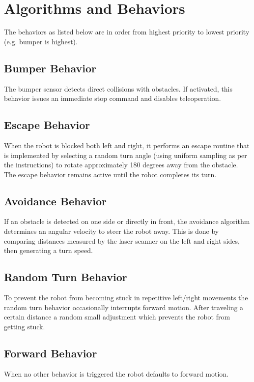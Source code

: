 \documentclass[12pt]{article}
\begin{document}
\section{Algorithms and Behaviors}

The behaviors as listed below are in order from highest priority to lowest priority (e.g. bumper is highest).

\subsection{Bumper Behavior}
The bumper sensor detects direct collisions with obstacles. If activated, this behavior issues an immediate stop command and disables teleoperation.

\subsection{Escape Behavior}
When the robot is blocked both left and right, it performs an escape routine that is implemented by selecting a random turn angle (using uniform sampling as per the instructions) to rotate approximately 180 degrees away from the obstacle. The escape behavior remains active until the robot completes its turn.

\subsection{Avoidance Behavior}
If an obstacle is detected on one side or directly in front, the avoidance algorithm determines an angular velocity to steer the robot away. This is done by comparing distances measured by the laser scanner on the left and right sides, then generating a turn speed.

\subsection{Random Turn Behavior}
To prevent the robot from becoming stuck in repetitive left/right movements the random turn behavior occasionally interrupts forward motion. After traveling a certain distance a random small adjustment which prevents the robot from getting stuck.

\subsection{Forward Behavior}
When no other behavior is triggered the robot defaults to forward motion.
\end{document}
